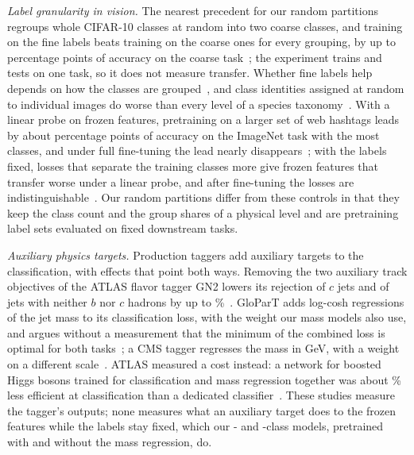 \emph{Label granularity in vision.} The nearest precedent for our random partitions regroups whole
CIFAR-10 classes at random into two coarse classes, and training on the fine labels beats training on the
coarse ones for every grouping, by up to \LitChenRandomMaxGain{} percentage points of accuracy on the
coarse task~\cite[Table~VI]{chen}; the experiment trains and tests on one task, so it does not measure
transfer. Whether fine labels help depends on how the classes are grouped~\cite[Fig.~3]{pirovano}, and class
identities assigned at random to individual images do worse than every level of a species
taxonomy~\cite{hong}. With a linear probe on frozen features, pretraining on a larger set of web hashtags leads
by about \LitMahajanLinearGapPercent{} percentage points of accuracy on the ImageNet task with the most classes,
and under full fine-tuning the lead nearly disappears~\cite{mahajan}; with the labels fixed, losses that separate
the training classes more give frozen features that transfer worse under a linear probe, and after fine-tuning
the losses are indistinguishable~\cite{kornblith}. Our
random partitions differ from these controls in that they keep the class count and the group shares of a
physical level and are pretraining label sets evaluated on fixed downstream tasks.

\emph{Auxiliary physics targets.} Production taggers add auxiliary targets to the classification,
with effects that point both ways. Removing the two auxiliary track objectives of the ATLAS flavor tagger
GN2 lowers its rejection of $c$ jets and of jets with neither $b$ nor $c$ hadrons by up to \LitGnTwoAuxRejectionDropPercent\%~\cite[Discussion]{gntwo}.
GloParT adds log-cosh regressions of the jet mass to its classification loss, with the weight our mass models
also use, and argues without a measurement that the minimum of the combined loss is optimal for both
tasks~\cite[Sec.~11.2.1]{glopart}; a CMS tagger regresses the mass in GeV, with a weight on a different
scale~\cite{cmspart}. ATLAS measured a cost instead: a network for boosted Higgs bosons trained for
classification and mass regression together was about \LitAtlasUnifiedEffDropPercent\% less efficient at
classification than a dedicated classifier~\cite[Sec.~6.5]{atlasgnx}. These studies measure the tagger's
outputs; none measures what an auxiliary target does to the frozen features while the labels stay fixed, which
our \Kres- and \Kcoarse-class models, pretrained with and without the mass regression, do.

